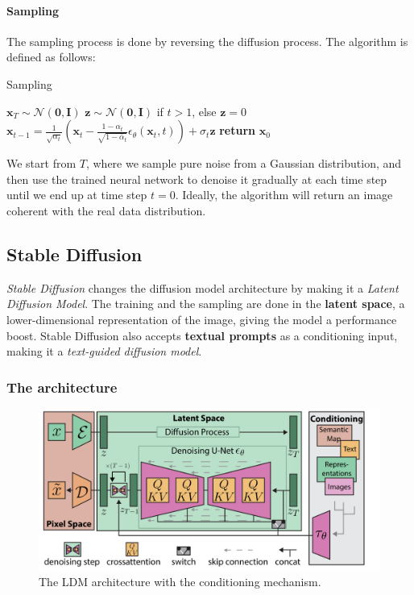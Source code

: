 \documentclass[preprint]{elsarticle}
\begin{document}
\paragraph{Sampling}
The sampling process is done by reversing the diffusion process. The algorithm is defined as follows:

\begin{algorithm}
    \caption{Sampling}\label{alg:sampling}
    \begin{algorithmic}[1]
    \State $\mathbf{x}_T \sim \mathcal{N}(\mathbf{0},\mathbf{I})$
        \State $\mathbf{z} \sim \mathcal{N}(\mathbf{0}, \mathbf{I})$ if $t >1$, else $\mathbf{z} =0$
        \State $\mathbf{x}_{t-1} = \frac{1}{\sqrt{\alpha_t}}\left(\mathbf{x}_t - \frac{1-\alpha_t}{\sqrt{1-\bar{\alpha}_t}}\epsilon_\theta(\mathbf{x}_t,t)\right) + \sigma_t \mathbf{z}$
    \EndFor
    \State \textbf{return} $\mathbf{x}_0$
    \end{algorithmic}
\end{algorithm}


We start from $T$, where we sample pure noise from a Gaussian distribution, 
and then use the trained neural network to denoise it gradually at each time step until we end up at time step $t=0$.
Ideally, the algorithm will return an image coherent with the real data distribution.


\subsection{Stable Diffusion}\label{sec:stable-diffusion}
\emph{Stable Diffusion} \cite{rombach2022highresolution} changes the diffusion model architecture by making 
it a \emph{Latent Diffusion Model}. 
The training and the sampling are done in the \textbf{latent space}, 
a lower-dimensional representation of the image, giving the model a performance boost.
Stable Diffusion also accepts \textbf{textual prompts} as a conditioning input, making it a \emph{text-guided diffusion model}.

\subsubsection{The architecture}\label{sec:ldm-architecture} 

\begin{figure}[b]
	\centering
    \includegraphics[scale=0.9]{img/svg/SDArch.png}
	\caption{The LDM architecture with the conditioning mechanism.}\label{fig:ldm-architecture}
\end{figure}
\end{document}

